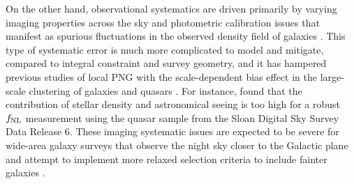 On the other hand, observational systematics are driven primarily by varying imaging properties across the sky \citep{ross2011} and photometric calibration issues that manifest as spurious fluctuations in the observed density field of galaxies \citep{huterer2013calibration}. This type of systematic error is much more complicated to model and mitigate, compared to integral constraint and survey geometry, and it has hampered previous studies of local PNG with the scale-dependent bias effect in the large-scale clustering of galaxies and quasars \citep[see, e.g.,][]{Ho2015JCAP...05..040H}. For instance, \cite{pullen2013systematic} found that the contribution of stellar density and astronomical seeing is too high for a robust $f_{\rm NL}$ measurement using the quasar sample from the Sloan Digital Sky Survey Data Release 6. These imaging systematic issues are expected to be severe for wide-area galaxy surveys that observe the night sky closer to the Galactic plane and attempt to implement more relaxed selection criteria to include fainter galaxies \citep[see, e.g,][]{kitanidis2020imaging}. 


